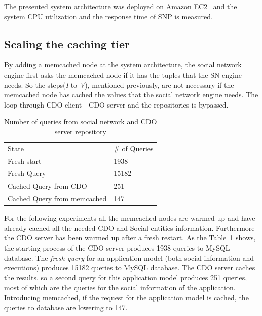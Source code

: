 The presented system architecture was deployed on Amazon EC2~\cite{amazon_url} and the system CPU utilization and the response time of SNP is measured.

\subsection{Scaling the caching tier}
\label{sec:eval_memcache}
By adding a memcached node at the system architecture, the social network engine first asks the memcached node if it has the tuples that the SN engine needs. So the steps(\emph{I} to \emph{V}), mentioned previously, are not necessary if the memcached node has cached the values that the social network engine needs. The loop through CDO client - CDO server and the repositories is bypassed. 

\begin{table}[]
\centering
\begin{tabular}{ll}
State        & \# of Queries \\
Fresh start  & 1938          \\
Fresh Query  & 15182         \\
Cached Query from CDO & 251           \\
Cached Query from memcached & 147  
\end{tabular}
\caption{Number of queries from social network and CDO server repository}
\label{tab:num_of_queries}
\end{table} 

For the following experiments all the memcached nodes are warmed up and have already cached all the needed CDO and Social entities information. Furthermore the CDO server has been warmed up after a fresh restart. As the Table~\ref{tab:num_of_queries} shows,
the starting process of the CDO server produces 1938 queries to MySQL database. The \emph{fresh query} for an application model (both social information and executions) produces 15182 queries to MySQL database. The CDO server caches the results, so a second query for this application model produces 251 queries, most of which are the queries for the social information of the application. Introducing memcached, if the request for the application model is cached, the queries to database are lowering to 147.  

